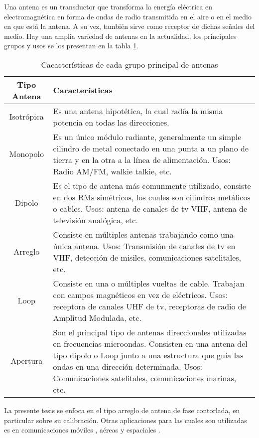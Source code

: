 Una antena es un transductor que transforma la energía eléctrica en electromagnética 
en forma de ondas de radio transmitida en el aire o en el medio en que está la antena. A su vez, también sirve como 
receptor de dichas señales del medio. Hay una amplia variedad de antenas en la actualidad, los principales grupos y usos 
se los presentan en la tabla \ref{tab:type_antennas}.

\begin{table}[H]
  \footnotesize
  \centering
  \begin{tabular}{|c|p{9cm}|}
	\hline
	\textbf{Tipo Antena} & \textbf{Características} \\\hline
	Isotrópica & Es una antena hipotética, la cual radía la misma potencia en todas las direcciones.\\\hline
	Monopolo & Es un único módulo radiante, generalmente un simple cilindro de metal conectado en una punta a un plano de 
	tierra y en la otra a la línea de alimentación. Usos: Radio AM/FM, walkie talkie, etc. \\\hline
	Dipolo & Es el tipo de antena más comunmente utilizado, consiste en dos RMs simétricos, los cuales son cilindros 
	metálicos o cables. Usos: antena de canales de tv VHF, antena de televisión analógica, etc. \\\hline
	Arreglo & Consiste en múltiples antenas trabajando como una única antena. Usos: Transmisión de canales de tv en VHF, 
	detección de misiles, comunicaciones satelitales, etc.\\\hline
	Loop & Consiste en una o múltiples vueltas de cable. Trabajan con campos magnéticos en vez de eléctricos. Usos: receptora 
	de canales UHF de tv, receptoras de radio de Amplitud Modulada, etc.\\\hline
	Apertura & Son el principal tipo de antenas direccionales utilizadas en frecuencias microondas. Consisten en una antena 
	del tipo dipolo o Loop junto a una estructura que guía las ondas en una dirección determinada. Usos: Comunicaciones 
	satelitales, comunicaciones marinas, etc.\\\hline
  \end{tabular}
  \caption{Cacacterísticas de cada grupo principal de antenas}
  \label{tab:type_antennas}
\end{table}

La presente tesis se enfoca en el tipo arreglo de antena de fase contorlada, en particular sobre su calibración. Otras aplicaciones para 
las cuales son utilizadas es en comunicaciones móviles \cite{Chen2012}, aéreas \cite{MHong1989} y espaciales 
\cite{Shimada1995}\cite{Makhoul2012}. 


